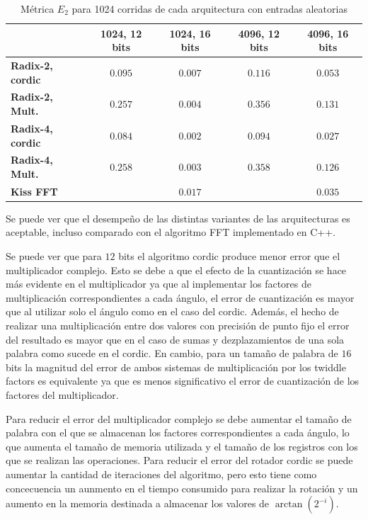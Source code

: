 \begin{table}[htb!]
\begin{tabular}{l c c c c }
 & \textbf{1024, 12 bits} & \textbf{1024, 16 bits} & \textbf{4096, 12 bits} & \textbf{4096, 16 bits}\\ \hline 
\textbf{Radix-2, cordic} & $0.095$ & $0.007$ & $0.116$ & $0.053$\\
\textbf{Radix-2, Mult.} & $0.257$ & $0.004$ & $0.356$ & $0.131$\\
\textbf{Radix-4, cordic} & $0.084$ & $0.002$ & $0.094$ & $0.027$\\
\textbf{Radix-4, Mult.} & $0.258$ & $0.003$ & $0.358$ & $0.126$\\ 
\textbf{Kiss FFT} & $ $ & $0.017$ & $ $ & $0.035$\\\hline
\end{tabular}
\caption{Métrica $E_2$ para 1024 corridas de cada arquitectura con entradas aleatorias}
\label{table:error2}
\end{table}

Se puede ver que el desempeño de las distintas variantes de las arquitecturas es aceptable, incluso
comparado con el algoritmo FFT implementado en C++.

Se puede ver que para $12$ bits el algoritmo cordic produce menor error que el multiplicador
complejo. Esto se debe a que el efecto de la cuantización se hace más evidente en el multiplicador
ya que al implementar los factores de multiplicación correspondientes a cada ángulo, el error de
cuantización es mayor que al utilizar solo el ángulo como en el caso del cordic. Además, el hecho de
realizar una multiplicación entre dos valores con precisión de punto fijo el error del resultado es
mayor que en el caso de sumas y dezplazamientos de una sola palabra como sucede en el cordic.
En cambio, para un tamaño de palabra de $16$ bits la magnitud del error de ambos sistemas de
multiplicación por los twiddle factors es equivalente ya que es menos significativo el error de
cuantización de los factores del multiplicador.

Para reducir el error del multiplicador complejo se debe
aumentar el tamaño de palabra con el que se almacenan los factores correspondientes a cada ángulo,
lo que aumenta el tamaño de memoria utilizada y el tamaño de los registros con los que se realizan
las operaciones. Para reducir el error del rotador cordic se puede aumentar la cantidad de
iteraciones del algoritmo, pero esto tiene como concecuencia un aunmento en el tiempo consumido para
realizar la rotación y un aumento en la memoria destinada a almacenar los valores de
$\arctan(2^{-i})$.

